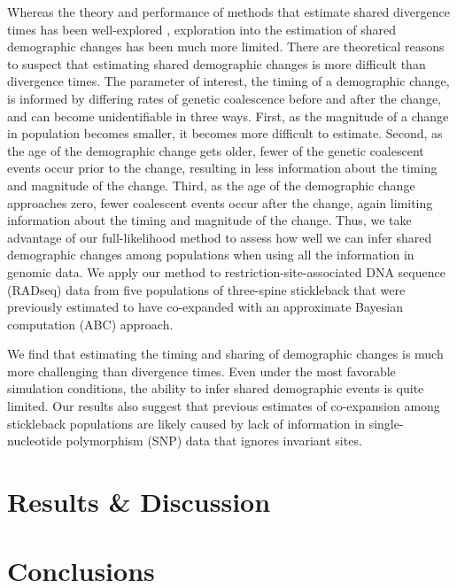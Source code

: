 Whereas the theory and performance of methods that estimate shared divergence
times has been well-explored
\citep[e.g.,][]{Oaks2012,Hickerson2013,Oaks2014reply,Oaks2014dpp,Overcast2017,Oaks2018ecoevolity},
exploration into the estimation of shared demographic changes has been much
more limited.
There are theoretical reasons to suspect that estimating shared demographic
changes is more difficult than divergence times.
The parameter of interest, the timing of a demographic change, is informed by
differing rates of genetic coalescence before and after the change, and can
become unidentifiable in three ways.
First, as the magnitude of a change in population becomes smaller,
it becomes more difficult to estimate.
Second, as the age of the demographic change gets older, fewer of the genetic
coalescent events occur prior to the change, resulting in less information
about the timing and magnitude of the change.
Third, as the age of the demographic change approaches zero, fewer coalescent
events occur after the change, again limiting information about the timing and
magnitude of the change.
Thus, we take advantage of our full-likelihood method to assess how well we can
infer shared demographic changes among populations when using all the
information in genomic data.
We apply our method to restriction-site-associated DNA sequence (RADseq) data
from five populations of three-spine stickleback that were previously estimated
to have co-expanded with an approximate Bayesian computation (ABC) approach.

We find that estimating the timing and sharing of demographic changes is much
more challenging than divergence times.
Even under the most favorable simulation conditions, the ability to infer
shared demographic events is quite limited.
Our results also suggest that previous estimates of co-expansion among
stickleback populations are likely caused by lack of information in
single-nucleotide polymorphism (SNP) data that ignores invariant sites.

\ifembed{

}{}


\section{Results \& Discussion}



\section{Conclusions}

